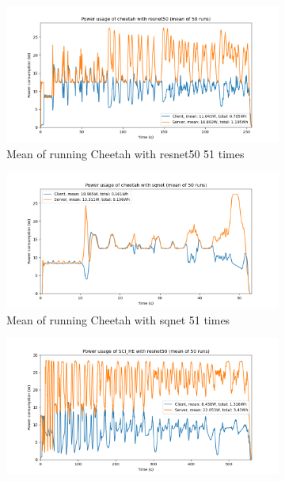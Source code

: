 \documentclass[../thesis.tex]{subfiles}
\begin{document}

\begin{figure}[hbt!]
    \begin{subfigure}{\linewidth}
            \includegraphics[width=\textwidth]{Thesis/Images/Means/mean_cheetah-resnet50.png}
            \caption{Mean of running Cheetah with resnet50 51 times}
            \label{fig:bmean_cheetah_resnet50}
    \end{subfigure}
    \begin{subfigure}{\linewidth}
            \includegraphics[width=\textwidth]{Thesis/Images/Means/mean_cheetah-sqnet.png}
            \caption{Mean of running Cheetah with sqnet 51 times}
            \label{fig:bmean_cheetah_sqnet}
    \end{subfigure}    
    \begin{subfigure}{\linewidth}
            \includegraphics[width=\textwidth]{Thesis/Images/Means/mean_SCI_HE-resnet50.png}

\end{subfigure}
\end{figure}
\end{document}
